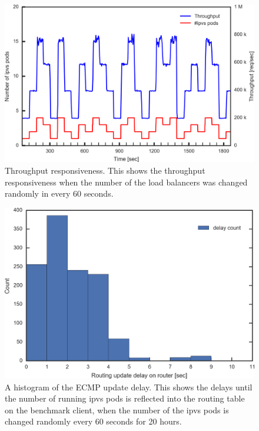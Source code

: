 \begin{figure}[h]
  \centering
  \includegraphics[width=0.98\columnwidth,left]{Figs/ecmp_response_ieice}
  \centering
  \begin{minipage}{0.9\columnwidth}
    \caption[Throughput responsiveness]{
      Throughput responsiveness.
      This shows the throughput responsiveness when the number of the load balancers was changed randomly in every 60 seconds.
    }
  \end{minipage}
  \label{fig:ecmp_response_ieice}
\end{figure}


\begin{figure}[h]
  \includegraphics[width=0.9\columnwidth,left]{Figs/ecmp_delay_histgram_ieice}
  \centering
  \begin{minipage}{0.9\columnwidth}
    \caption[A histogram of the ECMP update delay]{
      A histogram of the ECMP update delay.
      This shows the delays until the number of running ipvs pods is reflected into the routing table on the benchmark client,
    when the number of the ipvs pods is changed randomly every 60 seconds for 20 hours.
    }
  \end{minipage}
  \label{fig:ecmp_delay_histgram_ieice}
\end{figure}

